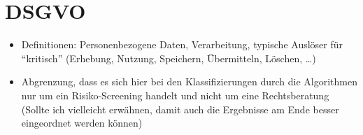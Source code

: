 \section{DSGVO}\label{sec:dsgvo}

\begin{itemize}
    \item Definitionen: Personenbezogene Daten, Verarbeitung, typische Auslöser für ``kritisch'' (Erhebung, Nutzung, Speichern, Übermitteln, Löschen, \ldots)
    \item Abgrenzung, dass es sich hier bei den Klassifizierungen durch die Algorithmen nur um ein Risiko-Screening handelt und nicht um eine Rechtsberatung (Sollte ich vielleicht erwähnen, damit auch die Ergebnisse am Ende besser eingeordnet werden können)
\end{itemize}